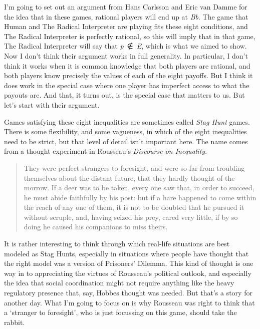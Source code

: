 \documentclass[
  11pt,
]{book}
\begin{document}
I'm going to set out an argument from Hans Carlsson and Eric van Damme \citeyearpar{CarlssonVanDamme1993} for the idea that in these games, rational players will end up at \emph{Bb}. The game that Human and The Radical Interpreter are playing fits these eight conditions, and The Radical Interpreter is perfectly rational, so this will imply that in that game, The Radical Interpreter will say that \emph{p}~∉~\emph{E}, which is what we aimed to show. Now I don't think their argument works in full generality. In particular, I don't think it works when it is common knowledge that both players are rational, and both players know precisely the values of each of the eight payoffs. But I think it does work in the special case where one player has imperfect access to what the payouts are. And that, it turns out, is the special case that matters to us. But let's start with their argument.

Games satisfying these eight inequalities are sometimes called \emph{Stag Hunt} games. There is some flexibility, and some vagueness, in which of the eight inequalities need to be strict, but that level of detail isn't important here. The name comes from a thought experiment in Rousseau's \emph{Discourse on Inequality}.

\begin{quote}
They were perfect strangers to foresight, and were so far from troubling themselves about the distant future, that they hardly thought of the morrow. If a deer was to be taken, every one saw that, in order to succeed, he must abide faithfully by his post: but if a hare happened to come within the reach of any one of them, it is not to be doubted that he pursued it without scruple, and, having seized his prey, cared very little, if by so doing he caused his companions to miss theirs. ~\citep[ 209--10]{Rousseau1913}
\end{quote}

It is rather interesting to think through which real-life situations are best modeled as Stag Hunts, especially in situations where people have thought that the right model was a version of Prisoners' Dilemma. This kind of thought is one way in to appreciating the virtues of Rousseau's political outlook, and especially the idea that social coordination might not require anything like the heavy regulatory presence that, say, Hobbes thought was needed. But that's a story for another day. What I'm going to focus on is why Rousseau was right to think that a `stranger to foresight', who is just focussing on this game, should take the rabbit.
\end{document}
